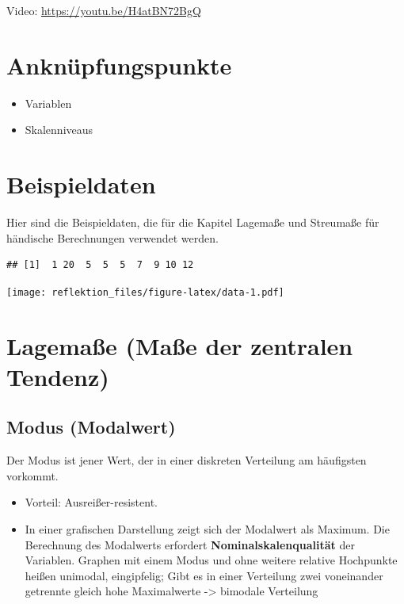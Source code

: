 \documentclass[
]{book}
\providecommand{\tightlist}{%
  \setlength{\itemsep}{0pt}\setlength{\parskip}{0pt}}
\begin{document}
Video: \url{https://youtu.be/H4atBN72BgQ}

\hypertarget{anknuxfcpfungspunkte}{%
\section{Anknüpfungspunkte}\label{anknuxfcpfungspunkte}}

\begin{itemize}
\tightlist
\item
  Variablen
\item
  Skalenniveaus
\end{itemize}

\hypertarget{beispieldaten}{%
\section{Beispieldaten}\label{beispieldaten}}

Hier sind die Beispieldaten, die für die Kapitel Lagemaße und Streumaße für händische Berechnungen verwendet werden.

\begin{verbatim}
## [1]  1 20  5  5  5  7  9 10 12
\end{verbatim}

\texttt{[image: reflektion\_files/figure-latex/data-1.pdf]}

\hypertarget{lagemauxdfe-mauxdfe-der-zentralen-tendenz}{%
\section{Lagemaße (Maße der zentralen Tendenz)}\label{lagemauxdfe-mauxdfe-der-zentralen-tendenz}}

\hypertarget{modus-modalwert}{%
\subsection{Modus (Modalwert)}\label{modus-modalwert}}

Der Modus ist jener Wert, der in einer diskreten Verteilung am häufigsten vorkommt.

\begin{itemize}
\tightlist
\item
  Vorteil: Ausreißer-resistent.
\item
  In einer grafischen Darstellung zeigt sich der Modalwert als Maximum. Die Berechnung des Modalwerts erfordert \textbf{Nominalskalenqualität} der Variablen. Graphen mit einem Modus und ohne weitere relative Hochpunkte heißen unimodal, eingipfelig; Gibt es in einer Verteilung zwei voneinander getrennte gleich hohe Maximalwerte -\textgreater{} bimodale Verteilung
\end{itemize}
\end{document}
